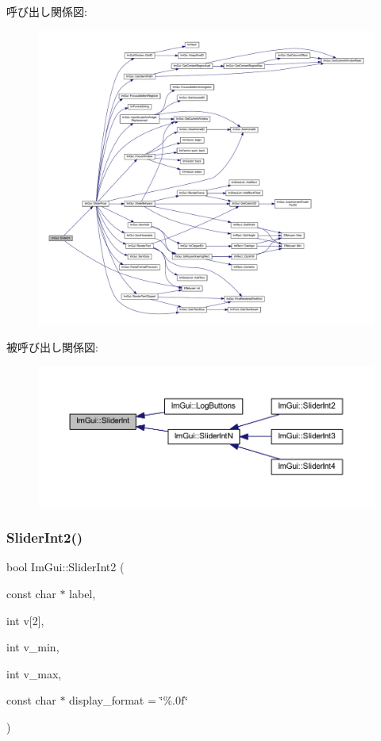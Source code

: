 呼び出し関係図\+:\nopagebreak
\begin{figure}[H]
\begin{center}
\leavevmode
\includegraphics[width=350pt]{namespace_im_gui_adfa3869210878bbf2c92c3c9383534f5_cgraph}
\end{center}
\end{figure}
被呼び出し関係図\+:\nopagebreak
\begin{figure}[H]
\begin{center}
\leavevmode
\includegraphics[width=350pt]{namespace_im_gui_adfa3869210878bbf2c92c3c9383534f5_icgraph}
\end{center}
\end{figure}
\mbox{\label{namespace_im_gui_a9dbd0490704d3bb4be10fdebe21d402d}} 
\subsubsection{\texorpdfstring{Slider\+Int2()}{SliderInt2()}}
{\footnotesize\ttfamily bool Im\+Gui\+::\+Slider\+Int2 (\begin{DoxyParamCaption}\item[{const char $\ast$}]{label,  }\item[{int}]{v\mbox{[}2\mbox{]},  }\item[{int}]{v\+\_\+min,  }\item[{int}]{v\+\_\+max,  }\item[{const char $\ast$}]{display\+\_\+format = {\ttfamily \char`\"{}\%.0f\char`\"{}} }\end{DoxyParamCaption})}



